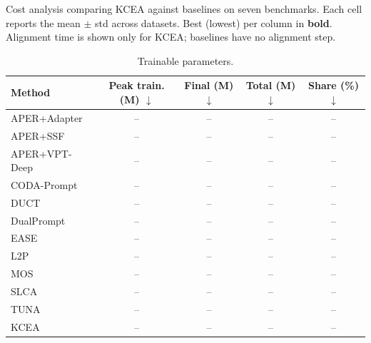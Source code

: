 \begin{table}[!t]
\centering
\caption{Cost analysis comparing KCEA against baselines on seven benchmarks. Each cell reports the mean $\pm$ std across datasets. Best (lowest) per column in \textbf{bold}. Alignment time is shown only for KCEA; baselines have no alignment step.}
\label{tab:cost-all}

\begin{subtable}{\textwidth}
  \centering
  \caption{Trainable parameters.}
  \label{tab:cost-params}
  \renewcommand{\arraystretch}{0.95}
\begin{adjustbox}{max width=\textwidth}
\footnotesize
\begin{tabular}{l c c c c}
\toprule
Method & \textbf{Peak train. (M)} $\downarrow$ & \textbf{Final (M)} $\downarrow$ & \textbf{Total (M)} $\downarrow$ & \textbf{Share (\%)} $\downarrow$ \\
\midrule
APER+Adapter & -- & -- & -- & -- \\
APER+SSF & -- & -- & -- & -- \\
APER+VPT-Deep & -- & -- & -- & -- \\
CODA-Prompt & -- & -- & -- & -- \\
DUCT & -- & -- & -- & -- \\
DualPrompt & -- & -- & -- & -- \\
EASE & -- & -- & -- & -- \\
L2P & -- & -- & -- & -- \\
MOS & -- & -- & -- & -- \\
SLCA & -- & -- & -- & -- \\
TUNA & -- & -- & -- & -- \\
\midrule
KCEA & -- & -- & -- & -- \\
\bottomrule
\end{tabular}
\end{adjustbox}
\end{subtable}

\vspace{0.6em}


\end{table}
